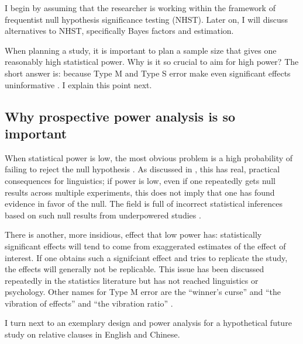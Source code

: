 \documentclass{ar-1col}\usepackage[]{graphicx}\usepackage[]{color}
\begin{document}
I begin by assuming that the researcher is working within the framework of frequentist null hypothesis significance testing (NHST). Later on, I will discuss alternatives to NHST, specifically Bayes factors and estimation.

When planning a study, it is important to plan a sample size that gives one reasonably high statistical power. Why is it so crucial to aim for high power? The short answer is: because Type M and Type S  error make even significant effects uninformative \citep{gelmancarlin}. I explain this point next.
\begin{marginnote}[]
\end{marginnote}

\subsection{Why prospective power analysis is so important}

When statistical power is low, the most obvious problem is a high probability of failing to reject the null hypothesis \citep{hoenigheisey}. As discussed in \citet{VasishthGelman2021}, this has real, practical consequences for linguistics; if power is low, even if one repeatedly gets null results across multiple experiments, this does not imply that one has found evidence in favor of the null. The field is full of incorrect statistical inferences based on such null results from underpowered studies \citep[e.g.,][]{PankratzEtAl2021,logacev2021statistical}.

There is another, more insidious, effect that low power has: statistically significant effects will tend to come from exaggerated estimates of the effect of interest. If one obtains such a signifciant effect and tries to replicate the study, the effects will generally not be replicable. This issue has been discussed repeatedly in the statistics literature \citep{lane1978estimating,hedges1984estimation} but has not reached linguistics or psychology. Other names for Type M error are the ``winner's curse'' and ``the vibration of effects'' \citep{powerfailure} and ``the vibration ratio'' \citep{ioannidis2008most}.




I turn next to an exemplary design and power analysis for a hypothetical future study on relative clauses in English and Chinese.
\end{document}
